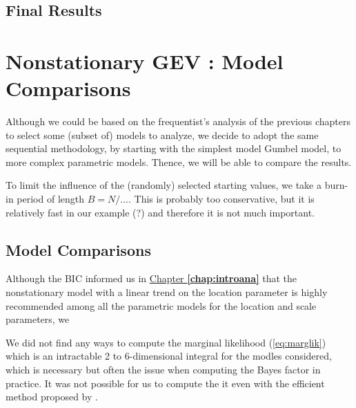 \subsection{Final Results}



\section{Nonstationary GEV : Model Comparisons}\label{sec:baycomp}


Although we could be based on the frequentist's analysis of the previous chapters to select some (subset of) models to analyze, we decide to adopt the same sequential methodology, by starting with the simplest model Gumbel model, to more complex parametric models. 
Thence, we will be able to compare the results.


To limit the influence of the (randomly) selected starting values, we take a burn-in period of length $B=N/....$ 
This is probably too conservative, but it is relatively fast in our example (?) and therefore it is not much important.


\subsection{Model Comparisons}


Although the BIC informed us in \hyperref[chap:introana]{Chapter \textbf{\ref{chap:introana}}} that the nonstationary model with a linear trend on the location parameter is highly recommended among all the parametric models for the location and scale parameters, we 

We did not find any ways to compute the marginal likelihood (\ref{eq:marglik}) which is an intractable 2 to 6-dimensional integral for the modles considered, which is necessary but often the issue when computing the Bayes factor in practice. 
It was not possible for us to compute the it even with the efficient method proposed by \citet{chib_1995}.

